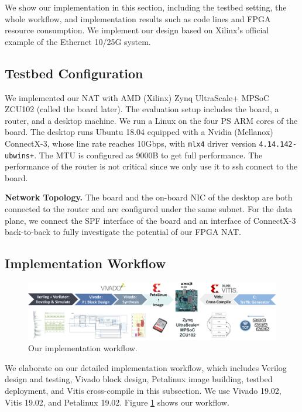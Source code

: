 
We show our implementation in this section, including the testbed setting, the whole workflow, and implementation results such as code lines and FPGA resource consumption. We implement our design based on Xilinx's official example of the Ethernet 10/25G system.
\subsection{Testbed Configuration}
We implemented our NAT with AMD (Xilinx) Zynq UltraScale+ MPSoC ZCU102 (called the board later). The evaluation setup includes the board, a router, and a desktop machine.
We run a Linux  on the four PS ARM cores of the board. 
The desktop runs Ubuntu 18.04 equipped with a Nvidia (Mellanox) ConnectX-3, 
whose line rate reaches 10Gbps, with \verb|mlx4| driver version \verb|4.14.142-ubwins+|. The MTU is configured as 9000B to get full performance.
The performance of the router is not critical since we only use it to ssh connect to the board.





\textbf{Network Topology.} 
The board and the on-board NIC of the desktop are both connected to the router and 
are configured under the same subnet. 
For the data plane, we connect the SPF interface of the board and an interface of ConnectX-3 back-to-back to fully investigate the potential of our FPGA NAT.

\subsection{Implementation Workflow}


\begin{figure}[h]
    \label{fig:workflow}
    \centering
    \includegraphics[width=500pt]{images/implworkflow.pdf}
    \caption{Our implementation workflow. }
\end{figure}

We elaborate on our detailed implementation workflow, which includes Verilog design and testing, Vivado block design, Petalinux image building, testbed deployment, and Vitis cross-compile in this subsection. We use Vivado 19.02, Vitis 19.02, and Petalinux 19.02. Figure \ref{fig:workflow} shows our workflow.


